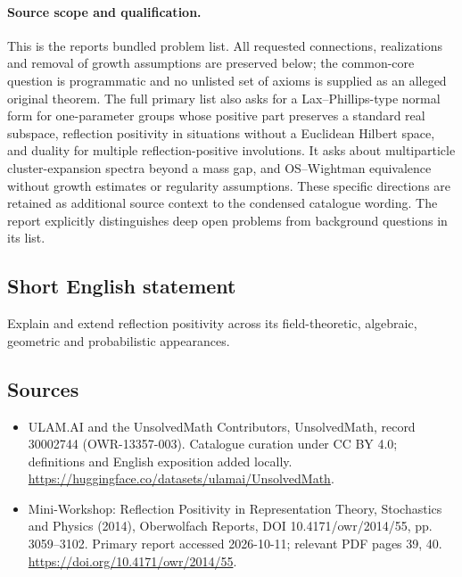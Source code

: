 \documentclass[11pt]{article}
\begin{document}
\paragraph{Source scope and qualification.}
This is the report\textquotesingle s bundled problem list. All requested connections, realizations and removal of growth assumptions are preserved below; the common-core question is programmatic and no unlisted set of axioms is supplied as an alleged original theorem. The full primary list also asks for a Lax--Phillips-type normal form for one-parameter groups whose positive part preserves a standard real subspace, reflection positivity in situations without a Euclidean Hilbert space, and duality for multiple reflection-positive involutions. It asks about multiparticle cluster-expansion spectra beyond a mass gap, and OS--Wightman equivalence without growth estimates or regularity assumptions. These specific directions are retained as additional source context to the condensed catalogue wording. The report explicitly distinguishes deep open problems from background questions in its list.
\subsection{Short English statement}
Explain and extend reflection positivity across its field-theoretic, algebraic, geometric and probabilistic appearances.
\subsection{Sources}
\begin{itemize}
\item[\hypertarget{source:30002744:1}{S1}] ULAM.AI and the UnsolvedMath Contributors, UnsolvedMath, record 30002744 (OWR-13357-003). Catalogue curation under CC BY 4.0; definitions and English exposition added locally.
\url{https://huggingface.co/datasets/ulamai/UnsolvedMath}.
\item[\hypertarget{source:30002744:2}{S2}] Mini-Workshop: Reflection Positivity in Representation Theory, Stochastics and Physics (2014), Oberwolfach Reports, DOI 10.4171/owr/2014/55, pp. 3059--3102. Primary report accessed 2026-10-11; relevant PDF pages 39, 40.
\url{https://doi.org/10.4171/owr/2014/55}.
\end{itemize}
\label{end:30002744}
\end{document}
